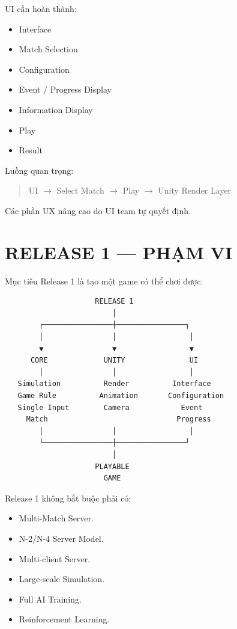 \documentclass[12pt,a4paper]{article}
\newcommand{\flow}[1]{%
  \begin{quote}\centering\ttfamily #1\end{quote}%
}
\begin{document}
UI cần hoàn thành:
\begin{itemize}[nosep]
  \item Interface
  \item Match Selection
  \item Configuration
  \item Event / Progress Display
  \item Information Display
  \item Play
  \item Result
\end{itemize}

Luồng quan trọng:

\flow{UI $\rightarrow$ Select Match $\rightarrow$ Play $\rightarrow$ Unity Render Layer}

Các phần UX nâng cao do UI team tự quyết định.

\section{RELEASE 1 --- PHẠM VI}

Mục tiêu Release 1 là tạo một game có thể chơi được.

\begin{verbatim}
                     RELEASE 1
                         │
        ┌────────────────┼────────────────┐
        │                │                 │
        ▼                ▼                 ▼
      CORE             UNITY               UI
        │                │                 │
   Simulation          Render          Interface
   Game Rule          Animation       Configuration
   Single Input        Camera            Event
     Match                              Progress
        │                │                 │
        └────────────────┼────────────────┘
                         │
                     PLAYABLE
                       GAME
\end{verbatim}

Release 1 không bắt buộc phải có:
\begin{itemize}[nosep]
  \item Multi-Match Server.
  \item N-2/N-4 Server Model.
  \item Multi-client Server.
  \item Large-scale Simulation.
  \item Full AI Training.
  \item Reinforcement Learning.
\end{itemize}
\end{document}
